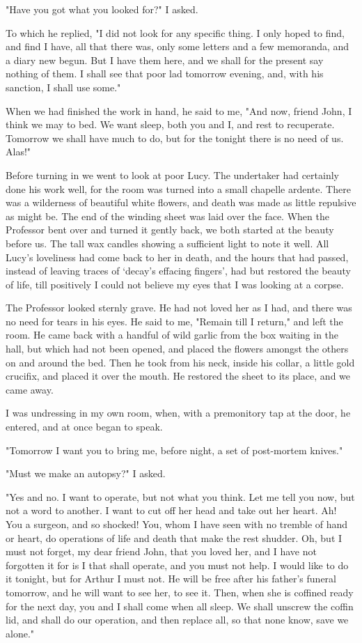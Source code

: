 "Have you got what you looked for?" I asked. 

To which he replied, "I did not look for any specific thing. I only hoped to find, and find I have, all that there was, only some letters and a few memoranda, and a diary new begun. But I have them here, and we shall for the present say nothing of them. I shall see that poor lad tomorrow evening, and, with his sanction, I shall use some." 

When we had finished the work in hand, he said to me, "And now, friend John, I think we may to bed. We want sleep, both you and I, and rest to recuperate. Tomorrow we shall have much to do, but for the tonight there is no need of us. Alas!" 

Before turning in we went to look at poor Lucy. The undertaker had certainly done his work well, for the room was turned into a small chapelle ardente. There was a wilderness of beautiful white flowers, and death was made as little repulsive as might be. The end of the winding sheet was laid over the face. When the Professor bent over and turned it gently back, we both started at the beauty before us. The tall wax candles showing a sufficient light to note it well. All Lucy's loveliness had come back to her in death, and the hours that had passed, instead of leaving traces of `decay's effacing fingers', had but restored the beauty of life, till positively I could not believe my eyes that I was looking at a corpse. 

The Professor looked sternly grave. He had not loved her as I had, and there was no need for tears in his eyes. He said to me, "Remain till I return," and left the room. He came back with a handful of wild garlic from the box waiting in the hall, but which had not been opened, and placed the flowers amongst the others on and around the bed. Then he took from his neck, inside his collar, a little gold crucifix, and placed it over the mouth. He restored the sheet to its place, and we came away. 

I was undressing in my own room, when, with a premonitory tap at the door, he entered, and at once began to speak. 

"Tomorrow I want you to bring me, before night, a set of post-mortem knives." 

"Must we make an autopsy?" I asked. 

"Yes and no. I want to operate, but not what you think. Let me tell you now, but not a word to another. I want to cut off her head and take out her heart. Ah! You a surgeon, and so shocked! You, whom I have seen with no tremble of hand or heart, do operations of life and death that make the rest shudder. Oh, but I must not forget, my dear friend John, that you loved her, and I have not forgotten it for is I that shall operate, and you must not help. I would like to do it tonight, but for Arthur I must not. He will be free after his father's funeral tomorrow, and he will want to see her, to see it. Then, when she is coffined ready for the next day, you and I shall come when all sleep. We shall unscrew the coffin lid, and shall do our operation, and then replace all, so that none know, save we alone." 


